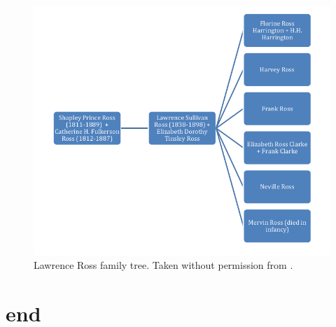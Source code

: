 \documentclass[12pt]{article}
\begin{document}
\begin{figure}[h]
\centering
\includegraphics[width=0.7\linewidth]{figures/lawrence_ross_family_tree}
\caption{Lawrence Ross family tree. Taken without permission from \cite{rosspapersummary}.}
\end{figure}

\newpage
\section{end}

\newpage
\printbibliography

\end{document}
